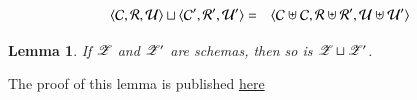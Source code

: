 \documentclass{elsarticle}
\newtheorem{lemma}{Lemma}
\begin{document}
\begin{definition}
\begin{eqnarray}
   \langle{\mathcal{C}},{\mathcal{R}},{\mathcal{U}}\rangle\sqcup\langle{\mathcal{C}'},{\mathcal{R}'},{\mathcal{U}'}\rangle&=&\langle{\mathcal{C}\uplus\mathcal{C}},{\mathcal{R}\uplus\mathcal{R}'},{\mathcal{U}\uplus\mathcal{U}'}\rangle
\end{eqnarray}
\end{definition}
\begin{lemma}
   If $\mathscr{Z}$ and $\mathscr{Z}'$ are schemas, then so is $\mathscr{Z}\sqcup\mathscr{Z}'$.
\end{lemma}
The proof of this lemma is published \href{location.domain}{here}
\end{document}
